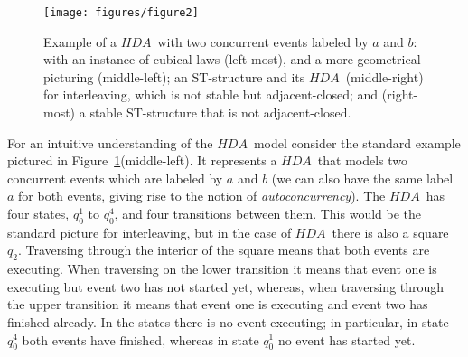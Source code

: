 \documentclass[submission,copyright,creativecommons]{eptcs}
\newcounter{case}
\newcommand\HDA{\ensuremath{\mathit{HDA}}}
\begin{document}
\begin{figure}[tp]
\begin{center}
\texttt{[image: figures/figure2]}
  \end{center}
\caption{Example of a \HDA\ with two concurrent events labeled by $a$ and $b$: with an instance of cubical laws (left-most), and a more geometrical picturing (middle-left); an ST-structure and its \HDA\ (middle-right) for interleaving, which is not stable but adjacent-closed; and (right-most) a stable ST-structure that is not adjacent-closed.}
\label{fig_ex_hda}
\end{figure}

For an intuitive understanding of the \HDA\ model consider the standard example \cite{Pratt03trans_cancel,Glabbeek06HDA} pictured in Figure~\ref{fig_ex_hda}(middle-left). It represents a \HDA\ that models two concurrent events which are labeled by $a$ and $b$ (we can also have the same label $a$ for both events, giving rise to the notion of \emph{autoconcurrency}). The \HDA\ has four states, $q_{0}^{1}$ to $q_{0}^{4}$, and four transitions between them. This would be the standard picture for interleaving, but in the case of \HDA\ there is also a square $q_{2}$. Traversing through the interior of the square means that both events are executing. When traversing on the lower transition it means that event one is executing but event two has not started yet, whereas, when traversing through the upper transition it means that event one is executing and event two has finished already. In the states there is no event executing; in particular, in state $q_{0}^{4}$ both events have finished, whereas in state $q_{0}^{1}$ no event has started yet.
\end{document}
